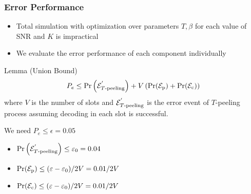 \begin{frame}\frametitle{Error Performance}
\begin{itemize}
\item Total simulation with optimization over parameters $T,\beta$ for each value of SNR and $K$ is impractical
\item  We evaluate the error performance of each component individually
\end{itemize}
\vspace{3ex}
\pause
\begin{block}{Lemma (Union Bound)}
\[
P_e \leq\Pr\left(\mathcal{E}^{'}_{T\text{-peeling}}\right)+V\left(\Pr(\mathcal{E}_{\mathrm{p}})+\Pr(\mathcal{E}_{\mathrm{c}}) \right)
\]
where $V$ is the number of slots and $\mathcal{E}^{'}_{T\text{-peeling}}$ is the error event of $T$-peeling process assuming decoding in each slot is successful.
\end{block}

\pause
We need $P_e\leq \epsilon=0.05$
\begin{itemize}
\item $\Pr\left(\mathcal{E}^{'}_{T\text{-peeling}}\right)\leq \varepsilon_0=0.04$
\item $\Pr(\mathcal{E}_{\mathrm{p}})\leq (\varepsilon-\varepsilon_0)/2V=0.01/2V$
\item $\Pr(\mathcal{E}_{\mathrm{c}})\leq (\varepsilon-\varepsilon_0)/2V=0.01/2V$
\end{itemize}
\end{frame}

